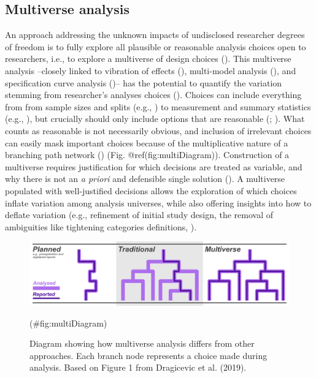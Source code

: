\documentclass[10pt,a4paper]{article}
\begin{document}
\subsection{Multiverse analysis}\label{multiverse-analysis}

An approach addressing the unknown impacts of undisclosed researcher degrees of freedom is to fully explore all plausible or reasonable analysis choices open to researchers, i.e., to explore a multiverse of design choices ().
This multiverse analysis --closely linked to vibration of effects (), multi-model analysis (), and specification curve analysis ()-- has the potential to quantify the variation stemming from researcher's analyses choices ().
Choices can include everything from from sample sizes and splits (e.g., ) to measurement and summary statistics (e.g., ), but crucially should only include options that are reasonable (; ).
What counts as reasonable is not necessarily obvious, and inclusion of irrelevant choices can easily mask important choices because of the multiplicative nature of a branching path network () (Fig. @ref(fig:multiDiagram)).
Construction of a multiverse requires justification for which decisions are treated as variable, and why there is not an \emph{a priori} and defensible single solution ().
A multiverse populated with well-justified decisions allows the exploration of which choices inflate variation among analysis universes, while also offering insights into how to deflate variation (e.g., refinement of initial study design, the removal of ambiguities like tightening categories definitions, ).

\begin{figure}
\includegraphics[width=1\linewidth]{../ext_images/Multiverse compared diagram updated} \caption{Diagram showing how multiverse analysis differs from other approaches. Each branch node represents a choice made during analysis. Based on Figure 1 from Dragicevic et al. (2019).}(\#fig:multiDiagram)
\end{figure}
\end{document}
